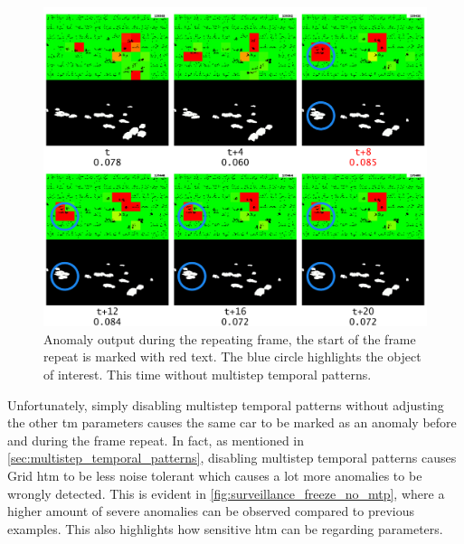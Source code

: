 \begin{figure}[H]
    \centering
    \includegraphics[width=\textwidth]{resources/experiments/surveillance/surveillance_freeze_no_mtp.png}
    \caption[Frame Repeat No Multistep Temporal Pattern Anomaly]{Anomaly output during the repeating frame, the start of the frame repeat is marked with red text. The blue circle highlights the object of interest. This time without multistep temporal patterns.}
    \label{fig:surveillance_freeze_no_mtp}
\end{figure}
Unfortunately, simply disabling multistep temporal patterns without adjusting the other \gls*{tm} parameters causes the same car to be marked as an anomaly before and during the frame repeat. In fact, as mentioned in \autoref{sec:multistep_temporal_patterns}, disabling multistep temporal patterns causes Grid \gls*{htm} to be less noise tolerant which causes a lot more anomalies to be wrongly detected. This is evident in \autoref{fig:surveillance_freeze_no_mtp}, where a higher amount of severe anomalies can be observed compared to previous examples. This also highlights how sensitive \gls*{htm} can be regarding parameters.
